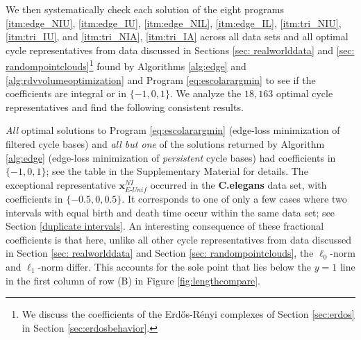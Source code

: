 \documentclass[11pt,onecolumn]{article}
\newcommand{\optimalrep}{\mathbf{x}}
\newcommand{\se}{Section }
\newcommand{\fig}{Figure }
\newcommand{\NI}{^{NI}}
\newcommand{\pr}{Program }
\newcommand{\EU}{_{E\text{-}Unif}}
\theoremstyle{plain}
\theoremstyle{definition}
\begin{document}
We then systematically check each solution of the eight programs
\ref{itm:edge_NIU},
\ref{itm:edge_IU},
\ref{itm:edge_NIL},
\ref{itm:edge_IL},
\ref{itm:tri_NIU}, 
\ref{itm:tri_IU}, and
\ref{itm:tri_NIA}, 
\ref{itm:tri_IA}
 across all data sets and all optimal cycle representatives from data discussed in Sections \ref{sec: realworlddata} and \ref{sec: randompointclouds}\footnote{We discuss the coefficients of the Erd\H{o}s-R\'enyi complexes of \se \ref{sec:erdos} in \se \ref{sec:erdosbehavior}.} found by Algorithms \ref{alg:edge} and \ref{alg:rdvvolumeoptimization} and Program \eqref{eq:escolarargmin} to see if the coefficients are integral or in $\{-1,0,1\}$. We analyze the $18{,}163$ optimal cycle representatives and find the following consistent results.
 
 
 \emph{All} optimal solutions to \pr \eqref{eq:escolarargmin} (edge-loss minimization of filtered cycle bases) and \emph{all but one}  of the solutions returned by Algorithm \ref{alg:edge} (edge-loss minimization of \emph{persistent} cycle bases)  had coefficients in $\{-1, 0, 1\}$; see the table in the Supplementary Material for details. The exceptional representative $\optimalrep\EU\NI$ occurred in the \textbf{C.elegans} data set, with coefficients in $\{-0.5,0,0.5\}$.  It corresponds to one of only a few cases where two intervals with equal birth and death time occur within the same data set; see \se \ref{duplicate intervals}. An interesting consequence of these fractional coefficients is that here, unlike all other cycle representatives from data discussed in \se \ref{sec: realworlddata} and \se \ref{sec: randompointclouds}, the $\ell_0$-norm and $\ell_1$-norm differ.  This accounts for the sole point that lies below the $y=1$ line in the first column of row (B) in \fig \ref{fig:lengthcompare}.
\end{document}
